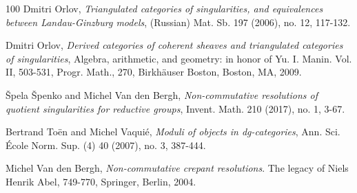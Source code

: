 \documentclass[11pt,reqno]{amsart}
\theoremstyle{definition}
\begin{document}
\begin{thebibliography}{100}
Dmitri Orlov,
{\it Triangulated categories of singularities, and equivalences between Landau-Ginzburg models},
(Russian) Mat. Sb. 197 (2006), no. 12, 117-132.

Dmitri Orlov,
{\it Derived categories of coherent sheaves and triangulated categories of singularities},
Algebra, arithmetic, and geometry: in honor of Yu. I. Manin. Vol. II,
503-531, Progr. Math., 270, Birkh\"{a}user Boston, Boston, MA, 2009.


 


\v{S}pela \v{S}penko and Michel Van den Bergh,
{\it Non-commutative resolutions of quotient singularities for reductive groups},
Invent. Math. 210 (2017), no. 1, 3-67.


Bertrand To\"en and Michel Vaqui\'{e}, 
{\it Moduli of objects in dg-categories},  
Ann. Sci. \'{E}cole Norm. Sup. (4) 40 (2007), no. 3, 387-444. 



Michel Van den Bergh,
{\it Non-commutative crepant resolutions}.
The legacy of Niels Henrik Abel, 749-770, Springer, Berlin, 2004.


	
\end{thebibliography}
\end{document}
